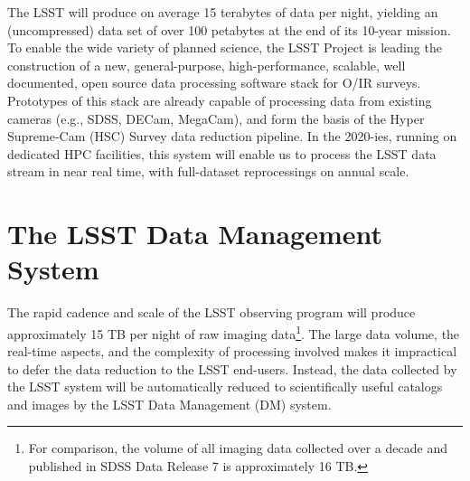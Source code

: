 \documentclass[11pt,twoside]{article}
\begin{document}
The LSST will produce on average 15 terabytes of data per night, yielding an
(uncompressed) data set of over 100 petabytes at the end of its 10-year
mission.  To enable the wide variety of planned science, the LSST Project is
leading the construction of a new, general-purpose, high-performance,
scalable, well documented, open source data processing software stack for
O/IR surveys.  Prototypes of this stack are already capable of processing
data from existing cameras (e.g., SDSS, DECam, MegaCam), and form the basis
of the Hyper Supreme-Cam (HSC) Survey data reduction pipeline.  In the
2020-ies, running on dedicated HPC facilities, this system will enable us to
process the LSST data stream in near real time, with full-dataset
reprocessings on annual scale.

\section{ The LSST Data Management System }
\label{sec:dm}

The rapid cadence and scale of the LSST observing program will produce
approximately 15 TB per night of raw imaging data\footnote{For
  comparison, the volume of all imaging data collected over a decade
  and published in SDSS Data Release 7 \citep{2009ApJS..182..543A} is approximately 16 TB.}. The large data volume, the real-time aspects, and the complexity of processing involved makes it impractical to defer the data reduction to the LSST end-users. Instead, the data collected by the LSST system will be automatically reduced to scientifically useful catalogs and images by the LSST Data Management (DM) system.
\\
\end{document}
